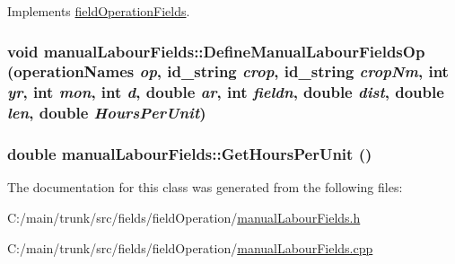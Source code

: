 Implements \hyperlink{classfield_operation_fields_ae5d8585b7e57196ce3801eed29677b3e}{fieldOperationFields}.\hypertarget{classmanual_labour_fields_ad4e466fe839f838862782a76ac05f063}{
\subsubsection[{DefineManualLabourFieldsOp}]{\setlength{\rightskip}{0pt plus 5cm}void manualLabourFields::DefineManualLabourFieldsOp ({\bf operationNames} {\em op}, \/  {\bf id\_\-string} {\em crop}, \/  {\bf id\_\-string} {\em cropNm}, \/  int {\em yr}, \/  int {\em mon}, \/  int {\em d}, \/  double {\em ar}, \/  int {\em fieldn}, \/  double {\em dist}, \/  double {\em len}, \/  double {\em HoursPerUnit})}}
\label{classmanual_labour_fields_ad4e466fe839f838862782a76ac05f063}
\hypertarget{classmanual_labour_fields_a136c2e2de43635528689f68b6bd8083f}{
\subsubsection[{GetHoursPerUnit}]{\setlength{\rightskip}{0pt plus 5cm}double manualLabourFields::GetHoursPerUnit ()}}
\label{classmanual_labour_fields_a136c2e2de43635528689f68b6bd8083f}


The documentation for this class was generated from the following files:\begin{DoxyCompactItemize}
\item 
C:/main/trunk/src/fields/fieldOperation/\hyperlink{manual_labour_fields_8h}{manualLabourFields.h}\item 
C:/main/trunk/src/fields/fieldOperation/\hyperlink{manual_labour_fields_8cpp}{manualLabourFields.cpp}\end{DoxyCompactItemize}
